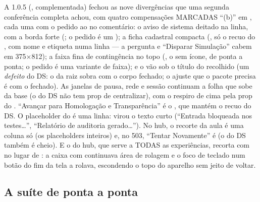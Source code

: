 A 1.0.5 (, complementada) fechou as nove divergências que uma
segunda conferência completa achou, com quatro compensações MARCADAS
\enquote{(b)} em , cada uma com o pedido ao
 no comentário: o aviso de sistema deitado na linha,
com a borda forte (; o pedido é um ); a ficha cadastral compacta (, só o recuo do
, com nome e etiqueta numa linha --- a pergunta e \enquote{Disparar
Simulação} cabem em 375$\times$812); a faixa fina de contingência no topo
(, o  sem ícone, de ponta a ponta;
o pedido é uma variante de faixa); e o vão sob o título do 
recolhido (um \emph{defeito} do DS: o  da raiz sobra com o corpo
fechado; o ajuste que o pacote precisa é  com o  fechado). As
janelas de pausa, rede e sessão continuam a folha que sobe da base (o
 do DS não tem prop de centralizar), com o respiro de cima pela
prop  do . \enquote{Avançar para Homologação e
Transparência} é o , que mantém o recuo do DS. O placeholder
do  é uma linha: virou o texto curto (\enquote{Entrada
bloqueada nos testes\ldots}, \enquote{Relatório de auditoria
gerado\ldots}). No hub, o recorte da aula é uma coluna só (os placeholders
inteiros) e, no 503, \enquote{Tentar Novamente} é  (o
 do DS também é cheio). E o  do hub, que
serve a TODAS as experiências, recorta com  no lugar de
: a caixa com  continuava área de rolagem e o foco de
teclado num botão do fim da tela a rolava, escondendo o topo do aparelho sem
jeito de voltar.

\subsection*{A suíte de ponta a ponta}

